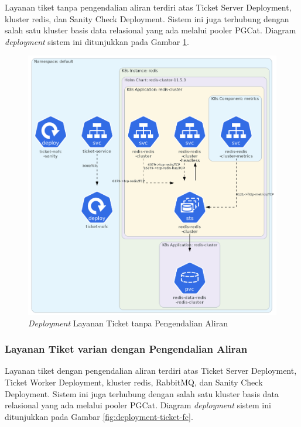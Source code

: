 Layanan tiket tanpa pengendalian aliran terdiri atas Ticket Server Deployment, kluster redis, dan Sanity Check Deployment. Sistem ini juga terhubung dengan salah satu kluster basis data relasional yang ada melalui pooler PGCat. Diagram \textit{deployment} sistem ini ditunjukkan pada Gambar \ref{fig:deployment-ticket-nofc}.

\begin{figure}[H]
    \centering
    \includegraphics[width=1\textwidth]{resources/chapter-4/ticket-nofc.png}
    \caption{\textit{Deployment} Layanan Ticket tanpa Pengendalian Aliran}
    \label{fig:deployment-ticket-nofc}
\end{figure}

\pagebreak

\subsubsection{Layanan Tiket varian dengan Pengendalian Aliran}

Layanan tiket dengan pengendalian aliran terdiri atas Ticket Server Deployment, Ticket Worker Deployment, kluster redis, RabbitMQ, dan Sanity Check Deployment. Sistem ini juga terhubung dengan salah satu kluster basis data relasional yang ada melalui pooler PGCat. Diagram \textit{deployment} sistem ini ditunjukkan pada Gambar \ref{fig:deployment-ticket-fc}.

